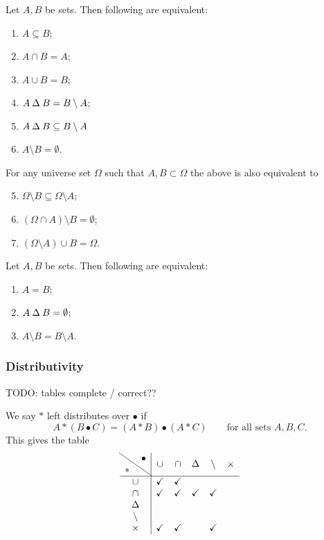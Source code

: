\begin{lemma}
Let $A,B$ be sets. Then following are equivalent:
\begin{enumerate}
\item $A\subseteq B$;
\item $A\cap B = A$;
\item $A\cup B = B$;
\item $A\mathbin{\Delta} B = B\setminus A$;
\item $A\mathbin{\Delta} B \subseteq B\setminus A$
\item $A\setminus B = \emptyset$.
\end{enumerate}
For any universe set $\Omega$ such that $A,B\subset \Omega$ the above is also equivalent to
\begin{enumerate}\setcounter{enumi}{4}
\item $\Omega\setminus B \subseteq \Omega\setminus A$;
\item $(\Omega\cap A)\setminus B = \emptyset$;
\item $(\Omega\setminus A)\cup B = \Omega$.
\end{enumerate}
\end{lemma}
\begin{corollary}
Let $A,B$ be sets. Then following are equivalent:
\begin{enumerate}
\item $A=B$;
\item $A\mathbin{\Delta} B = \emptyset$;
\item $A\setminus B = B\setminus A$.
\end{enumerate}
\end{corollary}

\subsubsection{Distributivity}
TODO: tables complete / correct??
\begin{lemma}
We say $*$ left distributes over $\bullet$ if
\[ A*(B\bullet C) = (A*B)\bullet (A*C) \qquad\text{for all sets $A,B,C$.} \]
This gives the table
\[ \begin{array}{c | c c c c c}
\text{\diagbox{$*$}{$\bullet$}} & \cup & \cap & \symdiff & \setminus & \times \\ \hline
\cup & \checkmark & \checkmark &  & & \\
\cap & \checkmark & \checkmark & \checkmark & \checkmark & \\
\symdiff &  &  &  & & \\
\setminus &  &  &  & & \\
\times & \checkmark & \checkmark &  & \checkmark &
\end{array} \]
\end{lemma}

